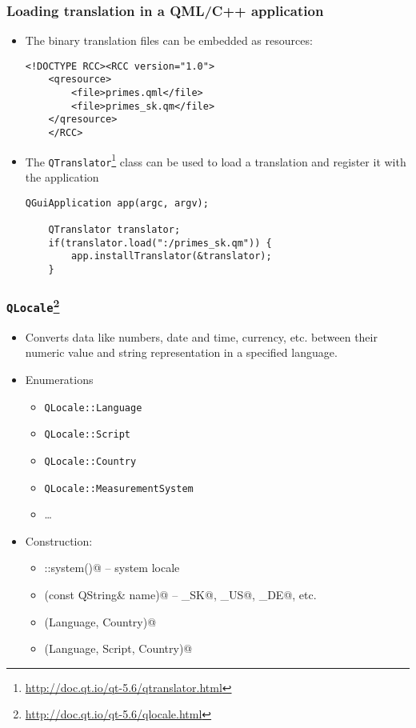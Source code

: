 \begin{frame}[fragile]
  \frametitle{Loading translation in a QML/C++ application}
  \small
  \begin{itemize}
   \item The binary translation files can be embedded as resources:
   \begin{lstlisting}[basicstyle=\scriptsize\ttfamily]
	<!DOCTYPE RCC><RCC version="1.0">
	<qresource>
	    <file>primes.qml</file>
	    <file>primes_sk.qm</file>
	</qresource>
	</RCC>
   \end{lstlisting}
   \item The \texttt{QTranslator}\footnote
     {\url{http://doc.qt.io/qt-5.6/qtranslator.html}} class can be used to load
     a translation and register it with the application
   \begin{lstlisting}[basicstyle=\scriptsize\ttfamily]
	QGuiApplication app(argc, argv);

	QTranslator translator;
	if(translator.load(":/primes_sk.qm")) {
	    app.installTranslator(&translator);
	}
   \end{lstlisting}
  \end{itemize}
\end{frame}

\begin{frame}[fragile]
  \frametitle{\texttt{QLocale}\footnote
   {\url{http://doc.qt.io/qt-5.6/qlocale.html}}}
  \begin{itemize}
    \item Converts data like numbers, date and time, currency, etc. between
      their numeric value and string representation in a specified language.
   \item Enumerations
   \begin{itemize}
     \small
     \item \texttt{QLocale::Language}
     \item \texttt{QLocale::Script}
     \item \texttt{QLocale::Country}
     \item \texttt{QLocale::MeasurementSystem}
     \item \ldots
   \end{itemize}
   \item Construction:
   \begin{itemize}
     \small
     \item \verb@QLocale::system()@ -- system locale
     \item \verb@QLocale(const QString& name)@ -- \verb@sk_SK@, \verb@en_US@,
       \verb@de_DE@, etc.
     \item \verb@QLocale(Language, Country)@
     \item \verb@QLocale(Language, Script, Country)@
   \end{itemize}
  \end{itemize}
\end{frame}

